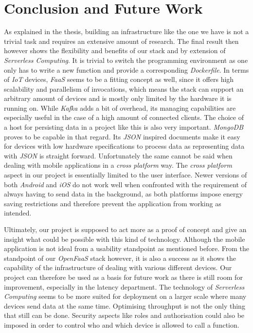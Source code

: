 \section{Conclusion and Future Work}
\label{sec:conclusion}

As explained in the thesis, building an infrastructure like the one we have is not a trivial task
and requires an extensive amount of research. The final result then however shows the flexibility
and benefits of our stack and by extension of \textit{Serverless Computing}. It is trivial to switch
the programming environment as one only has to write a new function and provide a corresponding
\textit{Dockerfile}. In terms of \textit{IoT} devices, \textit{FaaS} seems to be a fitting concept
as well, since it offers high scalability and parallelism of invocations, which means the stack can
support an arbitrary amount of devices and is mostly only limited by the hardware it is running on.
While \textit{Kafka} adds a bit of overhead, its managing capabilities are especially useful in the
case of a high amount of connected clients. The choice of a host for persisting data in a project
like this is also very important. \textit{MongoDB} proves to be capable in that regard. Its
\textit{JSON} inspired documents make it easy for devices with low hardware specifications to
process data as representing data with \textit{JSON} is straight forward. Unfortunately the same
cannot be said when dealing with mobile applications in a \textit{cross platform} way. The
\textit{cross platform} aspect in our project is essentially limited to the user interface. Newer
versions of both \textit{Android} and \textit{iOS} do not work well when confronted with the
requirement of always having to send data in the background, as both platforms impose energy saving
restrictions and therefore prevent the application from working as intended.

Ultimately, our project is supposed to act more as a proof of concept and give an insight what could
be possible with this kind of technology. Although the mobile application is not ideal from a
usability standpoint as mentioned before. From the standpoint of our \textit{OpenFaaS} stack
however, it is also a success as it shows the capability of the infrastructure of dealing with
various different devices. Our project can therefore be used as a basis for future work as there is
still room for improvement, especially in the latency department. The technology of
\textit{Serverless Computing} seems to be more suited for deployment on a larger scale where many
devices send data at the same time. Optimising throughput is not the only thing that still can be
done. Security aspects like roles and authorisation could also be imposed in order to control who
and which device is allowed to call a function.
